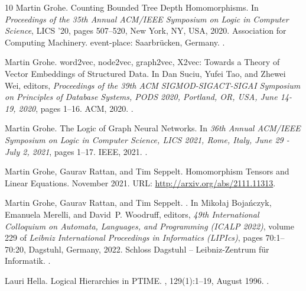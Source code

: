 \documentclass[a4paper,UKenglish,cleveref, autoref, thm-restate]{lipics-v2021}
\begin{document}
\begin{thebibliography}{10}
Martin Grohe.
\newblock Counting {Bounded} {Tree} {Depth} {Homomorphisms}.
\newblock In {\em Proceedings of the 35th {Annual} {ACM}/{IEEE} {Symposium} on
  {Logic} in {Computer} {Science}}, {LICS} '20, pages 507--520, New York, NY,
  USA, 2020. Association for Computing Machinery.
\newblock event-place: Saarbr{\"u}cken, Germany.
\newblock \href {https://doi.org/10.1145/3373718.3394739}
  {}.

Martin Grohe.
\newblock word2vec, node2vec, graph2vec, {X2vec}: {Towards} a {Theory} of
  {Vector} {Embeddings} of {Structured} {Data}.
\newblock In Dan Suciu, Yufei Tao, and Zhewei Wei, editors, {\em Proceedings of
  the 39th {ACM} {SIGMOD}-{SIGACT}-{SIGAI} {Symposium} on {Principles} of
  {Database} {Systems}, {PODS} 2020, {Portland}, {OR}, {USA}, {June} 14-19,
  2020}, pages 1--16. ACM, 2020.
\newblock \href {https://doi.org/10.1145/3375395.3387641}
  {}.

Martin Grohe.
\newblock The {Logic} of {Graph} {Neural} {Networks}.
\newblock In {\em 36th {Annual} {ACM}/{IEEE} {Symposium} on {Logic} in
  {Computer} {Science}, {LICS} 2021, {Rome}, {Italy}, {June} 29 - {July} 2,
  2021}, pages 1--17. IEEE, 2021.
\newblock \href {https://doi.org/10.1109/LICS52264.2021.9470677}
  {}.

Martin Grohe, Gaurav Rattan, and Tim Seppelt.
\newblock Homomorphism {Tensors} and {Linear} {Equations}.
\newblock November 2021.
\newblock URL: \url{http://arxiv.org/abs/2111.11313}.

Martin Grohe, Gaurav Rattan, and Tim Seppelt.
.
\newblock In Miko{\l}aj Boja\'{n}czyk, Emanuela Merelli, and David~P. Woodruff,
  editors, {\em 49th International Colloquium on Automata, Languages, and
  Programming (ICALP 2022)}, volume 229 of {\em Leibniz International
  Proceedings in Informatics (LIPIcs)}, pages 70:1--70:20, Dagstuhl, Germany,
  2022. Schloss Dagstuhl -- Leibniz-Zentrum f{\"u}r Informatik.
\newblock \href {https://doi.org/10.4230/LIPIcs.ICALP.2022.70}
  {}.

Lauri Hella.
\newblock Logical {Hierarchies} in {PTIME}.
, 129(1):1--19, August 1996.
\newblock \href {https://doi.org/10.1006/inco.1996.0070}
  {}.


\end{thebibliography}
\end{document}
